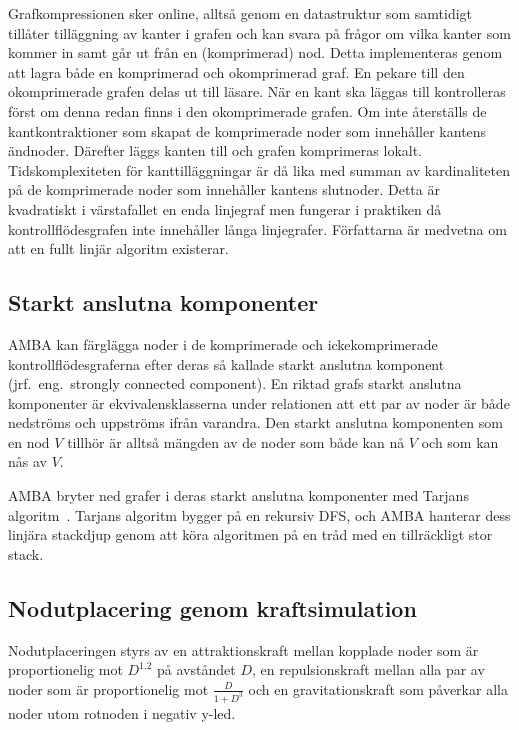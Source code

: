 Grafkompressionen sker online, alltså genom en datastruktur som samtidigt
tillåter tilläggning av kanter i grafen och kan svara på frågor om vilka kanter
som kommer in samt går ut från en (komprimerad) nod. Detta implementeras genom
att lagra både en komprimerad och okomprimerad graf. En pekare till den
okomprimerade grafen delas ut till läsare. När en kant ska läggas till
kontrolleras först om denna redan finns i den okomprimerade grafen. Om inte
återställs de kantkontraktioner som skapat de komprimerade noder som innehåller
kantens ändnoder. Därefter läggs kanten till och grafen komprimeras lokalt.
Tidskomplexiteten för kanttilläggningar är då lika med summan av kardinaliteten
på de komprimerade noder som innehåller kantens slutnoder. Detta är kvadratiskt
i värstafallet en enda linjegraf men fungerar i praktiken då
kontrollflödesgrafen inte innehåller långa linjegrafer. Författarna är medvetna
om att en fullt linjär algoritm existerar.

\subsection{Starkt anslutna komponenter}

AMBA kan färglägga noder i de komprimerade och ickekomprimerade
kontrollflödesgraferna efter deras så kallade starkt anslutna komponent (jrf.\
eng.\ strongly connected component). En riktad grafs starkt anslutna komponenter
är ekvivalensklasserna under relationen att ett par av noder är både nedströms
och uppströms ifrån varandra. Den starkt anslutna komponenten som en nod $V$
tillhör är alltså mängden av de noder som både kan nå $V$ och som kan nås av
$V$.

AMBA bryter ned grafer i deras starkt anslutna komponenter med Tarjans
algoritm~\cite{tarjan}. Tarjans algoritm bygger på en rekursiv DFS, och AMBA
hanterar dess linjära stackdjup genom att köra algoritmen på en tråd med en
tillräckligt stor stack.

\subsection{Nodutplacering genom kraftsimulation}

Nodutplaceringen styrs av en attraktionskraft mellan kopplade noder som är
proportionelig mot $D^{1.2}$ på avståndet $D$, en repulsionskraft mellan alla
par av noder som är proportionelig mot $\frac{D}{1+D^3}$ och en
gravitationskraft som påverkar alla noder utom rotnoden i negativ y-led.

